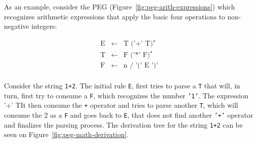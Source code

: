 \begin{example}\label{example:math-formulas-derivation}
   As an example, consider the PEG (Figure~\ref{fig:peg-arith-expressions}) which
   recognizes arithmetic expressions that apply the basic four operations to
   non-negative integers:

   \begin{figure*}[ht]
      \[
         \begin{array}{lcl}
            \text{E} & \leftarrow & \text{T ('+' T)}^\star \\
            \text{T} & \leftarrow & \text{F ('*' F)}^\star \\
            \text{F} & \leftarrow & \text{n / '(' E ')'} \\
         \end{array}
      \]
      \centering
      \caption{PEG for arithmetic expressions.}
      \label{fig:peg-arith-expressions}
   \end{figure*}

   Consider the string \texttt{1+2}. The initial rule \texttt{E}, first tries to
   parse a \texttt{T} that will, in turn, first try to consume a \texttt{F}, which
   recognizes the number \texttt{'1'}. The expression '+' TIt then consume the 
   \texttt{+} operator and tries to parse another \texttt{T}, which will consume 
   the 2 as a \texttt{F} and goes back to \texttt{E}, that does not find another 
   \texttt{'+'} operator and finalizes the parsing process. The derivation tree 
   for the string \texttt{1+2} can be seen on Figure~\ref{fig:peg-math-derivation}.


\end{example}
